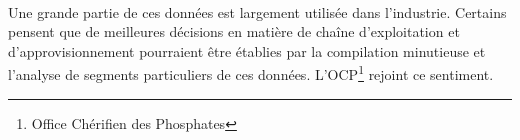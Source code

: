 \paragraph{} 
Une grande partie de ces données est largement utilisée dans l'industrie. Certains pensent que de meilleures décisions en matière de chaîne d'exploitation et d'approvisionnement pourraient être établies par la compilation minutieuse et l'analyse de segments particuliers de ces données. L'OCP\footnote{Office Chérifien des Phosphates} rejoint ce sentiment.